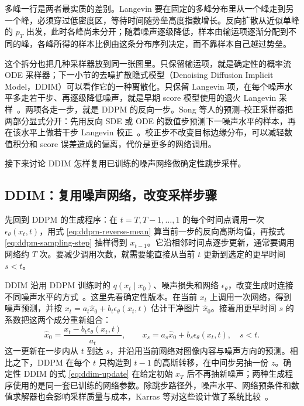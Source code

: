 多峰一行是两者最实质的差别。Langevin 要在固定的多峰分布里从一个峰走到另一个峰，必须穿过低密度区，等待时间随势垒高度指数增长。反向扩散从近似单峰的 \(p_T\) 出发，此时各峰尚未分开；随着噪声逐级降低，样本由输运项逐渐分配到不同的峰，各峰所得的样本比例由这条分布序列决定，而不靠样本自己越过势垒。

这个拆分也把几种采样器放到同一张图里。只保留输运项，就是确定性的概率流 ODE 采样器；下一小节的去噪扩散隐式模型（Denoising Diffusion Implicit Model，DDIM）可以看作它的一种离散化。只保留 Langevin 项，在每个噪声水平多走若干步、再逐级降低噪声，就是早期 score 模型使用的退火 Langevin 采样~\cite{song2020ncsn}。两项各走一步，就是 DDPM 的反向一步。Song 等人的预测--校正采样器把两部分显式分开：先用反向 SDE 或 ODE 的数值步预测下一噪声水平的样本，再在该水平上做若干步 Langevin 校正~\cite{song2021score}。校正步不改变目标边缘分布，可以减轻数值积分和 score 误差造成的偏离，代价是更多的网络调用。

接下来讨论 DDIM 怎样复用已训练的噪声网络做确定性跳步采样。

\subsection{DDIM：复用噪声网络，改变采样步骤}

先回到 DDPM 的生成程序：在 \(t=T,T-1,\ldots,1\) 的每个时间点调用一次 \(\epsilon_\theta(x_t,t)\)，用式 \eqref{eq:ddpm-reverse-mean} 算当前一步的反向高斯均值，再按式 \eqref{eq:ddpm-sampling-step} 抽样得到 \(x_{t-1}\)。它沿相邻时间点逐步更新，通常要调用网络约 \(T\) 次。要减少调用次数，就需要能直接从当前 \(t\) 更新到选定的更早时间 \(s<t\)。

DDIM 沿用 DDPM 训练时的 \(q(x_t\mid x_0)\)、噪声损失和网络 \(\epsilon_\theta\)，改变生成时连接不同噪声水平的方式~\cite{song2021ddim}。这里先看确定性版本。在当前 \(x_t\) 上调用一次网络，得到噪声预测，并按 \(x_t=a_t\hat x_0+b_t\epsilon_\theta(x_t,t)\) 估计干净图片 \(\hat x_0\)。接着用更早时间 \(s\) 的系数把这两个成分重新组合：
\begin{equation}
 \hat x_0=\frac{x_t-b_t\epsilon_\theta(x_t,t)}{a_t},\qquad
 x_s=a_s\hat x_0+b_s\epsilon_\theta(x_t,t),\quad s<t.
 \label{eq:ddim-update}
\end{equation}
这一更新在一步内从 \(t\) 到达 \(s\)，并沿用当前网络对图像内容与噪声方向的预测。相比之下，DDPM 在每个 \(t\) 只构造到 \(t-1\) 的高斯转移，在中间步另抽一份 \(z\)。确定性 DDIM 的式 \eqref{eq:ddim-update} 在给定初始 \(x_T\) 后不再抽新噪声；两种生成程序使用的是同一套已训练的网络参数。除跳步路径外，噪声水平、网络预条件和数值求解器也会影响采样质量与成本，Karras 等对这些设计做了系统比较~\cite{karras2022edm}。

